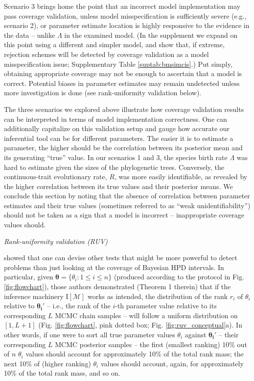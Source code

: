 \documentclass[oneside]{article}
\begin{document}
Scenario 3 brings home the point that an incorrect model implementation may pass coverage validation, unless model misspecification is sufficiently severe (e.g., scenario 2), or parameter estimate location is highly responsive to the evidence in the data -- unlike $\Lambda$ in the examined model.
(In the supplement we expand on this point using a different and simpler model, and show that, if extreme, rejection schemes will be detected by coverage validation as a model misspecification issue; Supplementary Table \ref{suptab:bmsimcis}.)
Put simply, obtaining appropriate coverage may not be enough to ascertain that a model is correct.
Potential biases in parameter estimates may remain undetected unless more investigation is done (see rank-uniformity validation below).

The three scenarios we explored above illustrate how coverage validation results can be interpreted in terms of model implementation correctness.
One can additionally capitalize on this validation setup and gauge how accurate our inferential tool can be for different parameters. 
The easier it is to estimate a parameter, the higher should be the correlation between its posterior mean and its generating ``true'' value.
In our scenarios 1 and 3, the species birth rate $\Lambda$ was hard to estimate given the sizes of the phylogenetic trees.
Conversely, the continuous-trait evolutionary rate, $R$, was more easily identifiable, as revealed by the higher correlation between its true values and their posterior means.
We conclude this section by noting that the absence of correlation between parameter estimates and their true values (sometimes referred to as ``weak unidentifiability'') should not be taken as a sign that a model is incorrect -- inappropriate coverage values should.

\vspace{.25cm}

\noindent \emph{Rank-uniformity validation (RUV)}

\cite{Talts2018} showed that one can devise other tests that might be more powerful to detect problems than just looking at the coverage of Bayesian HPD intervals.
In particular, given $\boldsymbol{\theta} = \{\theta_i : 1 \leq i \leq n\}$ (produced according to the protocol in Fig. \ref{fig:flowchart}), those authors demonstrated (Theorem 1 therein) that if the inference machinery $\text{I}[\mathcal{M}]$ works as intended, the distribution of the rank $r_i$ of $\theta_i$ relative to $\boldsymbol{\theta_i'}$ -- i.e., the rank of the $i$-th parameter value relative to its corresponding $L$ MCMC chain samples --
will follow a uniform distribution on $[1, L + 1]$ (Fig. \ref{fig:flowchart}, pink dotted box; Fig. \ref{fig:ruv_conceptual}a).
In other words, if one were to sort all true parameter values $\theta_i$ against $\boldsymbol{\theta_i'}$ -- their corresponding $L$ MCMC posterior samples -- the first (smallest ranking) 10\% out of $n$ $\theta_i$ values should account for approximately 10\% of the total rank mass; the next 10\% of (higher ranking) $\theta_i$ values should account, again, for approximately 10\% of the total rank mass, and so on.
\end{document}
